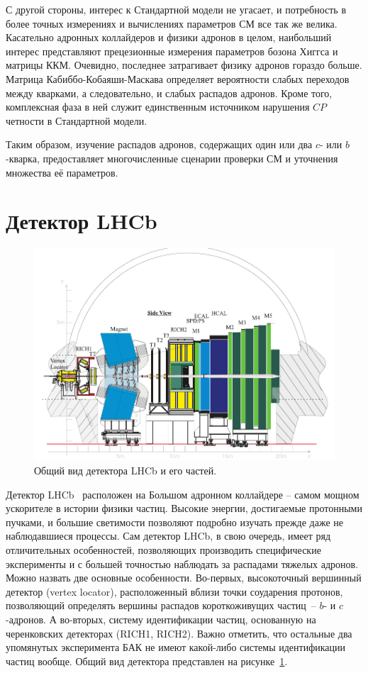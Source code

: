 \documentclass[a4paper, 10pt, twocolumn]{article}
\begin{document}
С другой стороны, интерес к Стандартной модели не угасает, 
и потребность в более точных измерениях и вычислениях параметров СМ все 
так же велика. Касательно адронных коллайдеров и физики адронов 
в целом, наибольший интерес представляют прецезионные измерения 
параметров бозона Хиггса и матрицы ККМ. Очевидно, последнее затрагивает 
физику адронов гораздо больше. Матрица Кабиббо-Кобаяши-Маскава 
определяет вероятности слабых переходов между кварками, 
а следовательно, и слабых распадов адронов. Кроме того, комплексная 
фаза в ней служит единственным источником нарушения 
$CP$четности в Стандартной модели.

Таким образом, изучение распадов адронов, содержащих один или два $c$- 
или $b$-кварка, предоставляет многочисленные сценарии проверки СМ 
и уточнения множества её параметров.


\section{Детектор LHCb}

\begin{figure}%
	\centering
	\includegraphics[width=.67\linewidth]{figures/LHCb-detector}
	\caption{Общий вид детектора LHCb и его частей.}
	\label{fig:detector}
\end{figure}%

Детектор LHCb~\cite{LHCb-detector} расположен на Большом адронном 
коллайдере -- самом мощном ускорителе в истории физики частиц. Высокие 
энергии, достигаемые протонными пучками, и большие светимости позволяют 
подробно изучать прежде даже не наблюдавшиеся процессы. Сам детектор 
LHCb, в свою очередь, имеет ряд отличительных особенностей, позволяющих 
производить специфические эксперименты и с большей точностью наблюдать 
за распадами тяжелых адронов. Можно назвать две основные особенности. 
Во-первых, высокоточный вершинный детектор (vertex locator), 
расположенный вблизи точки соударения протонов, позволяющий определять 
вершины распадов короткоживущих частиц~-- $b$- и $c$-адронов. 
А во-вторых, систему идентификации частиц, основанную на черенковских 
детекторах (RICH1, RICH2). Важно отметить, что остальные два упомянутых  
эксперимента БАК не имеют какой-либо системы идентификации частиц 
вообще. Общий вид детектора представлен на рисунке~\ref{fig:detector}.
\end{document}
